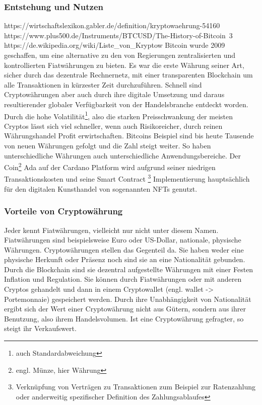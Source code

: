 \documentclass[12pt]{article}
\begin{document}
	\subsubsection{Entstehung und Nutzen}
		https://wirtschaftslexikon.gabler.de/definition/kryptowaehrung-54160 \\
		https://www.plus500.de/Instruments/BTCUSD/The-History-of-Bitcoin~3 \\
		https://de.wikipedia.org/wiki/Liste\_von\_Kryptow%
		Bitcoin wurde 2009 geschaffen, um eine alternative zu den von Regierungen zentralisierten und kontrollierten Fiatwährungen zu bieten. Es war die erste Währung seiner Art, sicher durch das dezentrale Rechnernetz, mit einer transparenten Blockchain um alle Transaktionen in kürzester Zeit durchzuführen. Schnell sind Cryptowährungen aber auch durch ihre digitale Umsetzung und daraus resultierender globaler Verfügbarkeit von der Handelsbranche entdeckt worden. Durch die hohe Volatilität\footnote{auch Standardabweichung}, also die starken Preisschwankung der meisten Cryptos lässt sich viel schneller, wenn auch Risikoreicher, durch reinen Währungshandel Profit erwirtschaften. Bitcoins Beispiel sind bis heute Tausende von neuen Währungen gefolgt und die Zahl steigt weiter. So haben unterschiedliche Währungen auch unterschiedliche Anwendungsbereiche. Der Coin\footnote{engl. Münze, hier Währung} Ada auf der Cardano Platform wird aufgrund seiner niedrigen Transaktionskosten und seine Smart Contract \footnote{Verknüpfung von Verträgen zu Transaktionen zum Beispiel zur Ratenzahlung oder anderweitig spezifischer Definition des Zahlungsablaufes} Implementierung hauptsächlich für den digitalen Kunsthandel von sogenannten NFTs genutzt. 
		
	\subsubsection{Vorteile von Cryptowährung}
		Jeder kennt Fiatwährungen, vielleicht nur nicht unter diesem Namen. Fiatwährungen sind beispielsweise Euro oder US-Dollar, nationale, physische Währungen. Cryptowährungen stellen das Gegenteil da. Sie haben weder eine physische Herkunft oder Präsenz noch sind sie an eine Nationalität gebunden. Durch die Blockchain sind sie dezentral aufgestellte Währungen mit einer Festen Inflation und Regulation. Sie können durch Fiatwährungen oder mit anderen Cryptos gehandelt und dann in einem Cryptowallet (engl. wallet -> Portemonnaie) gespeichert werden. Durch ihre Unabhängigkeit von Nationalität ergibt sich der Wert einer Cryptowährung nicht aus Gütern, sondern aus ihrer Benutzung, also ihrem Handelsvolumen. Ist eine Cryptowährung gefragter, so steigt ihr Verkaufswert.
\end{document}
